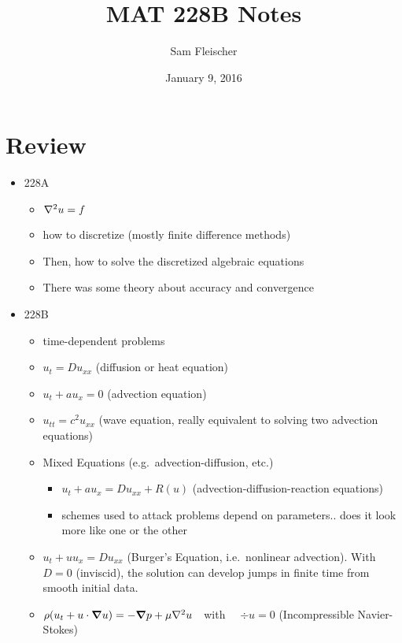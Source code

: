 \documentclass{article}
\title{MAT 228B Notes}
\author{Sam Fleischer}
\date{January 9, 2016}
\begin{document}
    \maketitle

    \section{Review}

        \begin{itemize}
            \item 228A
            \begin{itemize}
                \item $\laplacian u = f$
                \item how to discretize (mostly finite difference methods)
                \item Then, how to solve the discretized algebraic equations
                \item There was some theory about accuracy and convergence
            \end{itemize}
            \item 228B
            \begin{itemize}
                \item time-dependent problems
                \item $u_t = Du_{xx}$ (diffusion or heat equation)
                \item $u_t + au_x = 0$ (advection equation)
                \item $u_{tt} = c^2u_{xx}$ (wave equation, really equivalent to solving two advection equations)
                \item Mixed Equations (e.g.~advection-diffusion, etc.)
                \begin{itemize}
                    \item $u_t + au_x = Du_{xx} + R(u)$ (advection-diffusion-reaction equations)
                    \item schemes used to attack problems depend on parameters.. does it look more like one or the other
                \end{itemize}
                \item $u_t + uu_x = Du_{xx}$ (Burger's Equation, i.e.~nonlinear advection).  With $D = 0$ (inviscid), the solution can develop jumps in finite time from smooth initial data.
                \item $\rho\qty(u_t + u\cdot\grad u) = -\grad p + \mu\laplacian u$\ \ with \ \ $\div u = 0$ (Incompressible Navier-Stokes)
            \end{itemize}
        \end{itemize}
\end{document}
